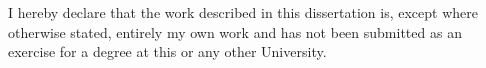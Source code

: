 
\begin{declaration}

I hereby declare that the work described in this dissertation is, except where otherwise stated, entirely my own work and has not been submitted as an exercise for a degree at this or any other University.


\end{declaration}